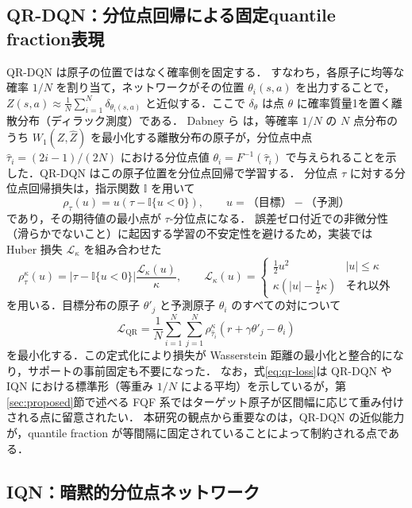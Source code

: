 \documentclass[a4paper,10pt]{jsarticle}
\theoremstyle{definition}
\newcommand{\Wone}{W_1}
\renewcommand{\Finv}{F^{-1}}
\begin{document}
\subsection{QR-DQN：分位点回帰による固定quantile fraction表現}
QR-DQN \cite{dabney2018qrdqn} は原子の位置ではなく確率側を固定する．
すなわち，各原子に均等な確率 $1/N$ を割り当て，ネットワークがその位置 $\theta_i(s,a)$ を出力することで，$Z(s,a)\approx\frac1N\sum_{i=1}^N\delta_{\theta_i(s,a)}$ と近似する．ここで $\delta_\theta$ は点 $\theta$ に確率質量1を置く離散分布（ディラック測度）である．
Dabney ら \cite{dabney2018qrdqn} は，等確率 $1/N$ の $N$ 点分布のうち $\Wone(Z,\hat Z)$ を最小化する離散分布の原子が，分位点中点 $\hat\tau_i=(2i-1)/(2N)$ における分位点値
$\theta_i=\Finv(\hat\tau_i)$ で与えられることを示した．QR-DQN はこの原子位置を分位点回帰で学習する．
分位点 $\tau$ に対する分位点回帰損失は，指示関数 $\mathbb{I}$ を用いて
\begin{equation}
  \rho_\tau(u)=u\left(\tau-\mathbb{I}\{u<0\}\right),\qquad u=\text{（目標）}-\text{（予測）}
\end{equation}
であり，その期待値の最小点が $\tau$-分位点になる．
誤差ゼロ付近での非微分性（滑らかでないこと）に起因する学習の不安定性を避けるため，実装では Huber 損失 $\mathcal{L}_\kappa$ を組み合わせた
\begin{equation}
  \rho^\kappa_\tau(u)=\left|\tau-\mathbb{I}\{u<0\}\right|\frac{\mathcal{L}_\kappa(u)}{\kappa},\qquad
  \mathcal{L}_\kappa(u)=\begin{cases}\tfrac12u^2 & |u|\le\kappa\\ \kappa(|u|-\tfrac12\kappa)& \text{それ以外}\end{cases}
  \label{eq:huber-quantile}
\end{equation}
を用いる．目標分布の原子 $\theta'_j$ と予測原子 $\theta_i$ のすべての対について
\begin{equation}
  \mathcal{L}_{\mathrm{QR}}=\frac1N\sum_{i=1}^N\sum_{j=1}^N\rho^\kappa_{\hat\tau_i}\!\left(r+\gamma\theta'_j-\theta_i\right)
  \label{eq:qr-loss}
\end{equation}
を最小化する．この定式化により損失が Wasserstein 距離の最小化と整合的になり，サポートの事前固定も不要になった．
なお，式\eqref{eq:qr-loss}は QR-DQN や IQN における標準形（等重み $1/N$ による平均）を示しているが，第\ref{sec:proposed}節で述べる FQF 系ではターゲット原子が区間幅に応じて重み付けされる点に留意されたい．
本研究の観点から重要なのは，QR-DQN の近似能力が，quantile fraction が等間隔に固定されていることによって制約される点である．

\subsection{IQN：暗黙的分位点ネットワーク}
\label{subsec:iqn}
\end{document}
